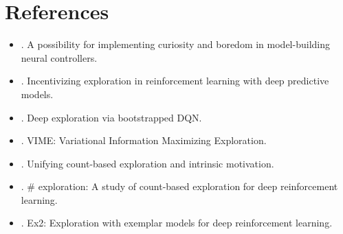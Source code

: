 \section{References}
\begin{itemize}
	\item {}. A possibility for implementing curiosity and boredom in model-building neural controllers.
	\item {}. Incentivizing exploration in reinforcement learning with deep predictive models.
	\item {}. Deep exploration via bootstrapped DQN.
	\item {}. VIME: Variational Information Maximizing Exploration.
	\item {}. Unifying count-based exploration and intrinsic motivation.
	\item {}. \# exploration: A study of count-based exploration for deep reinforcement learning.
	\item {}. Ex2: Exploration with exemplar models for deep reinforcement learning.
\end{itemize}